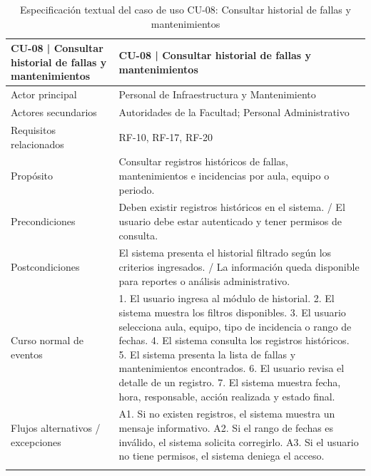 \begingroup
\small
\begin{longtable}{|P{0.5000}|P{0.5000}|}
\hline
CU-08 | Consultar historial de fallas y mantenimientos & CU-08 | Consultar historial de fallas y mantenimientos \\ \hline
Actor principal & Personal de Infraestructura y Mantenimiento \\ \hline
Actores secundarios & Autoridades de la Facultad; Personal Administrativo \\ \hline
Requisitos relacionados & RF-10, RF-17, RF-20 \\ \hline
Propósito & Consultar registros históricos de fallas, mantenimientos e incidencias por aula, equipo o periodo. \\ \hline
Precondiciones & Deben existir registros históricos en el sistema. / El usuario debe estar autenticado y tener permisos de consulta. \\ \hline
Postcondiciones & El sistema presenta el historial filtrado según los criterios ingresados. / La información queda disponible para reportes o análisis administrativo. \\ \hline
Curso normal de eventos & 1. El usuario ingresa al módulo de historial. 2. El sistema muestra los filtros disponibles. 3. El usuario selecciona aula, equipo, tipo de incidencia o rango de fechas. 4. El sistema consulta los registros históricos. 5. El sistema presenta la lista de fallas y mantenimientos encontrados. 6. El usuario revisa el detalle de un registro. 7. El sistema muestra fecha, hora, responsable, acción realizada y estado final. \\ \hline
Flujos alternativos / excepciones & A1. Si no existen registros, el sistema muestra un mensaje informativo. A2. Si el rango de fechas es inválido, el sistema solicita corregirlo. A3. Si el usuario no tiene permisos, el sistema deniega el acceso. \\ \hline
\caption{Especificación textual del caso de uso CU-08: Consultar historial de fallas y mantenimientos}
\end{longtable}
\endgroup

